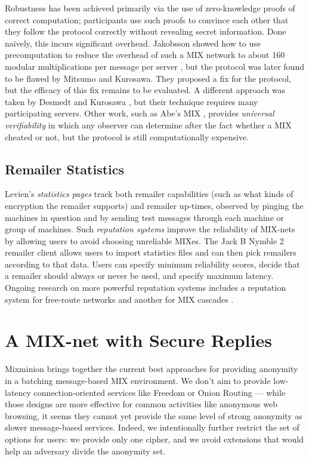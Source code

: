 \documentclass{llncs}
\begin{document}
Robustness has been achieved primarily via the use of zero-knowledge
proofs of correct computation; participants use such proofs to convince
each other that they follow the protocol correctly without revealing secret
information. Done na\"{\a i}vely, this incurs significant
overhead. 
Jakobsson showed how to use precomputation to reduce the overhead of
such a MIX network to about 160 modular multiplications
per message per server \cite{flash-mix}, but the protocol was later
found to be flawed \cite{mitkuro} by Mitsumo and Kurosawa. They
proposed a fix for the protocol, but the efficacy of this fix remains
to be evaluated.  A different approach was taken by Desmedt and
Kurosawa \cite{desmedt}, but their technique requires many
participating servers. Other work, such as Abe's MIX \cite{abe},
provides \emph{universal verifiability} in which any observer can
determine after the fact whether a MIX cheated or not, but
the protocol is still computationally expensive.

\subsection{Remailer Statistics}

Levien's \emph{statistics pages} \cite{levien} track both remailer
capabilities (such as what kinds of encryption the remailer supports)
and remailer up-times, observed by pinging the machines in question
and by sending test messages through each machine or group of machines.
Such \emph{reputation systems} improve the reliability of MIX-nets by
allowing users to avoid choosing unreliable MIXes. The Jack B Nymble 2
remailer client \cite{potato} allows users to import statistics files
and can then pick remailers according to that data. Users can specify
minimum reliability scores, decide that a remailer should always or never
be used, and specify maximum latency. Ongoing research on more powerful
reputation systems includes a reputation system for free-route networks
\cite{mix-acc} and another for MIX cascades \cite{casc-rep}.


\section{A MIX-net with Secure Replies}
\label{sec:design}

Mixminion brings together the current best approaches for providing
anonymity in a batching message-based MIX environment. We don't aim
to provide low-latency connection-oriented services like Freedom
\cite{freedom} or Onion Routing \cite{goldschlag99} --- while those
designs are more effective for common activities like anonymous web
browsing, it seems they cannot yet provide the same level of strong
anonymity as slower message-based services. Indeed, we intentionally
further restrict the set of options for users: we provide only one
cipher, and we avoid extensions that would help an adversary divide the
anonymity set.
\end{document}
